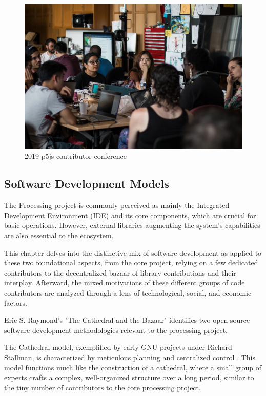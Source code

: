 
\begin{figure}
	\centering
	\includegraphics[width=\textwidth]{images/cathedral-or-bazaar.jpeg}
	\caption{2019 p5js contributor conference}
	\label{fig:p5ps-conference}
\end{figure}


\subsection{Software Development Models}

The Processing project is commonly perceived as mainly the Integrated Development Environment (IDE) and its core components, which are crucial for basic operations. However, external libraries augmenting the system’s capabilities are also essential to the ecosystem.

This chapter delves into the distinctive mix of software development as applied to these two foundational aspects, from the core project, relying on a few dedicated contributors to the decentralized bazaar of library contributions and their interplay. Afterward, the mixed motivations of these different groups of code contributors are analyzed through a lens of technological, social, and economic factors.

Eric S. Raymond’s "The Cathedral and the Bazaar" \parencite{raymondCathedralBazaar1999} identifies two open-source software development methodologies relevant to the processing project. 

The Cathedral model, exemplified by early GNU projects under Richard Stallman, is characterized by meticulous planning and centralized control \parencite{stallmanFreeSoftwareFree2002}. This model functions much like the construction of a cathedral, where a small group of experts crafts a complex, well‐organized structure over a long period, similar to the tiny number of contributors to the core processing project. 

